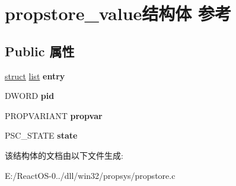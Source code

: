 \hypertarget{structpropstore__value}{}\section{propstore\+\_\+value结构体 参考}
\label{structpropstore__value}
\subsection*{Public 属性}
\begin{DoxyCompactItemize}
\item 
\mbox{\label{structpropstore__value_a878dabc21288e1738431c0cd615062a9}} 
\hyperlink{interfacestruct}{struct} \hyperlink{classlist}{list} {\bfseries entry}
\item 
\mbox{\label{structpropstore__value_abb0f8e10557c48c7e22c8e8aa70cdd8a}} 
D\+W\+O\+RD {\bfseries pid}
\item 
\mbox{\label{structpropstore__value_a72902bd07e114cc3fbd9e9ec3194f650}} 
P\+R\+O\+P\+V\+A\+R\+I\+A\+NT {\bfseries propvar}
\item 
\mbox{\label{structpropstore__value_a703da94488043773021cd6a239af40ad}} 
P\+S\+C\+\_\+\+S\+T\+A\+TE {\bfseries state}
\end{DoxyCompactItemize}


该结构体的文档由以下文件生成\+:\begin{DoxyCompactItemize}
\item 
E\+:/\+React\+O\+S-\/0../dll/win32/propsys/propstore.\+c\end{DoxyCompactItemize}
